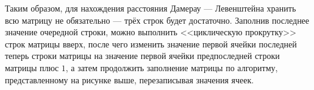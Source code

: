 Таким образом, для нахождения расстояния Дамерау --- Левенштейна хранить всю матрицу не обязательно --- трёх строк будет достаточно.
Заполнив последнее значение очередной строки, можно выполнить <<циклическую прокрутку>> строк матрицы вверх, после чего изменить значение первой ячейки последней теперь строки матрицы на значение первой ячейки предпоследней строки матрицы плюс $1$, а затем продолжить заполнение матрицы по алгоритму, представленному на рисунке выше, перезаписывая значения ячеек.

